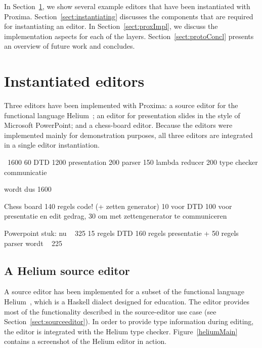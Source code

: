 In Section~\ref{sect:sampleEditors}, we show several example editors that have been instantiated with Proxima. Section~\ref{sect:instantiating} discusses the components that are required for instantiating an editor. In Section~\ref{sect:proxImpl}, we discuss the implementation aspects for each of the layers.  Section~\ref{sect:protoConcl} presents an overview of future work and concludes.

\section{Instantiated editors} \label{sect:sampleEditors}

Three editors have been implemented with Proxima: a source editor for the functional language Helium~\cite{heeren03helium}; an editor for presentation slides in the style of Microsoft PowerPoint; and a chess-board editor. Because the editors were implemented mainly for demonstration purposes, all three editors are integrated in a single editor instantiation.



\bc
~1600
60   DTD
1200 presentation
200  parser
150  lambda reducer
200  type checker communicatie

wordt dus 1600


Chess board 140 regels code!   (+ zetten generator)
10 voor DTD
100 voor presentatie en edit gedrag, 
30 om met zettengenerator te communiceren


Powerpoint stuk: nu ~ 325     15 regels DTD 160 regels presentatie + 50 regels parser 
wordt ~ 225  
\ec


\subsection{A Helium source editor}



A source editor has been implemented for a subset of the functional language Helium~\cite{heeren03helium}, which is a  Haskell dialect designed for education. The editor provides most of the functionality described in the source-editor use case (see Section~\ref{sect:sourceeditor}). In order to provide type information during editing, the editor is integrated with the Helium type checker. Figure~\ref{heliumMain} contains a screenshot of the Helium editor in action. 




